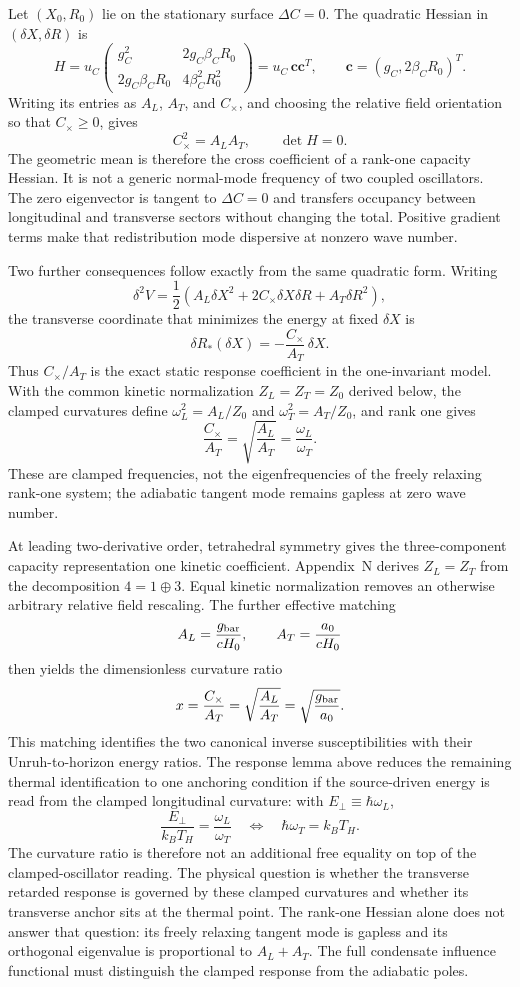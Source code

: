 \documentclass[11pt]{article}
\begin{document}
Let $(X_0,R_0)$ lie on the stationary surface $\Delta C=0$. The quadratic Hessian in $(\delta X,\delta R)$ is
\[
H=u_C
\begin{pmatrix}
g_C^2 & 2g_C\beta_C R_0\\
2g_C\beta_C R_0 & 4\beta_C^2R_0^2
\end{pmatrix}
=u_C\,\mathbf c\mathbf c^T,
\qquad
\mathbf c=(g_C,2\beta_C R_0)^T.
\]
Writing its entries as $A_L$, $A_T$, and $C_\times$, and choosing the relative field orientation so that $C_\times\ge0$, gives
\[
C_\times^2=A_LA_T,
\qquad
\det H=0.
\]
The geometric mean is therefore the cross coefficient of a rank-one capacity Hessian. It is not a generic normal-mode frequency of two coupled oscillators. The zero eigenvector is tangent to $\Delta C=0$ and transfers occupancy between longitudinal and transverse sectors without changing the total. Positive gradient terms make that redistribution mode dispersive at nonzero wave number.

Two further consequences follow exactly from the same quadratic form. Writing
\[
\delta^2V=\frac12\left(A_L\delta X^2+2C_\times\delta X\delta R+A_T\delta R^2\right),
\]
the transverse coordinate that minimizes the energy at fixed $\delta X$ is
\[
\delta R_*(\delta X)=-\frac{C_\times}{A_T}\,\delta X.
\]
Thus $C_\times/A_T$ is the exact static response coefficient in the one-invariant model. With the common kinetic normalization $Z_L=Z_T=Z_0$ derived below, the clamped curvatures define $\omega_L^2=A_L/Z_0$ and $\omega_T^2=A_T/Z_0$, and rank one gives
\[
\frac{C_\times}{A_T}=\sqrt{\frac{A_L}{A_T}}=\frac{\omega_L}{\omega_T}.
\]
These are clamped frequencies, not the eigenfrequencies of the freely relaxing rank-one system; the adiabatic tangent mode remains gapless at zero wave number.

At leading two-derivative order, tetrahedral symmetry gives the three-component capacity representation one kinetic coefficient. Appendix~N derives $Z_L=Z_T$ from the decomposition $4=1\oplus3$. Equal kinetic normalization removes an otherwise arbitrary relative field rescaling. The further effective matching
\[
A_L=\frac{g_{\rm bar}}{cH_0},
\qquad
A_T=\frac{a_0}{cH_0}
\]
then yields the dimensionless curvature ratio
\[
x=\frac{C_\times}{A_T}=\sqrt{\frac{A_L}{A_T}}
=\sqrt{\frac{g_{\rm bar}}{a_0}}.
\]
This matching identifies the two canonical inverse susceptibilities with their Unruh-to-horizon energy ratios. The response lemma above reduces the remaining thermal identification to one anchoring condition if the source-driven energy is read from the clamped longitudinal curvature: with $E_\perp\equiv\hbar\omega_L$,
\[
\frac{E_\perp}{k_BT_H}=\frac{\omega_L}{\omega_T}
\quad\Longleftrightarrow\quad
\hbar\omega_T=k_BT_H.
\]
The curvature ratio is therefore not an additional free equality on top of the clamped-oscillator reading. The physical question is whether the transverse retarded response is governed by these clamped curvatures and whether its transverse anchor sits at the thermal point. The rank-one Hessian alone does not answer that question: its freely relaxing tangent mode is gapless and its orthogonal eigenvalue is proportional to $A_L+A_T$. The full condensate influence functional must distinguish the clamped response from the adiabatic poles.
\end{document}
